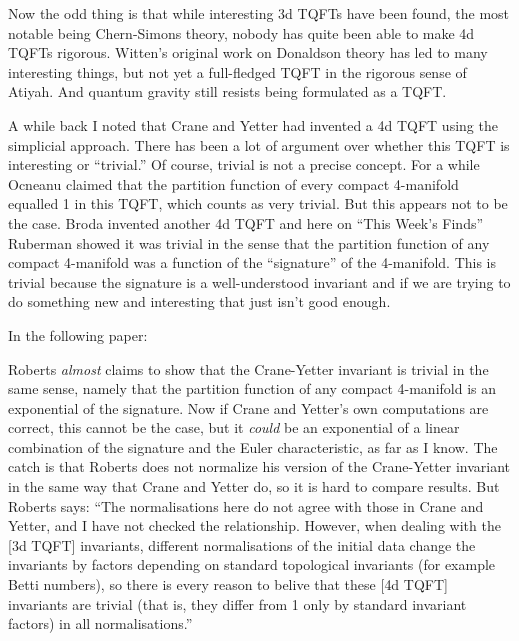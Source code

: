 \documentclass{article}
\def\tightlist{}
\renewcommand{\texttt}[1]{%
  \begingroup
  \ttfamily
  \begingroup\lccode`~=`/\lowercase{\endgroup\def~}{/\discretionary{}{}{}}%
  \begingroup\lccode`~=`[\lowercase{\endgroup\def~}{[\discretionary{}{}{}}%
  \begingroup\lccode`~=`.\lowercase{\endgroup\def~}{.\discretionary{}{}{}}%
  \catcode`/=\active\catcode`[=\active\catcode`.=\active
  \scantokens{#1\noexpand}%
  \endgroup
}
\begin{document}
Now the odd thing is that while interesting 3d TQFTs have been found,
the most notable being Chern-Simons theory, nobody has quite been able
to make 4d TQFTs rigorous. Witten's original work on Donaldson theory
has led to many interesting things, but not yet a full-fledged TQFT in
the rigorous sense of Atiyah. And quantum gravity still resists being
formulated as a TQFT.

A while back I noted that Crane and Yetter had invented a 4d TQFT using
the simplicial approach. There has been a lot of argument over whether
this TQFT is interesting or ``trivial.'' Of course, trivial is not a
precise concept. For a while Ocneanu claimed that the partition function
of every compact 4-manifold equalled 1 in this TQFT, which counts as
very trivial. But this appears not to be the case. Broda invented
another 4d TQFT and here on ``This Week's Finds'' Ruberman showed it was
trivial in the sense that the partition function of any compact
4-manifold was a function of the ``signature'' of the 4-manifold. This
is trivial because the signature is a well-understood invariant and if
we are trying to do something new and interesting that just isn't good
enough.

In the following paper:


Roberts \emph{almost} claims to show that the Crane-Yetter invariant is
trivial in the same sense, namely that the partition function of any
compact 4-manifold is an exponential of the signature. Now if Crane and
Yetter's own computations are correct, this cannot be the case, but it
\emph{could} be an exponential of a linear combination of the signature
and the Euler characteristic, as far as I know. The catch is that
Roberts does not normalize his version of the Crane-Yetter invariant in
the same way that Crane and Yetter do, so it is hard to compare results.
But Roberts says: ``The normalisations here do not agree with those in
Crane and Yetter, and I have not checked the relationship. However, when
dealing with the {[}3d TQFT{]} invariants, different normalisations of
the initial data change the invariants by factors depending on standard
topological invariants (for example Betti numbers), so there is every
reason to belive that these {[}4d TQFT{]} invariants are trivial (that
is, they differ from 1 only by standard invariant factors) in all
normalisations.''
\end{document}
